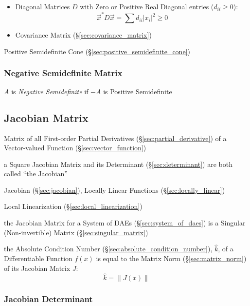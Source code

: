 \begin{itemize}
  \item Diagonal Matrices $D$ with Zero or Positive Real Diagonal entries
    ($d_{ii} \geq 0$):
    \[
      \vec{x}^*D\vec{x} = \sum d_{ii}|x_i|^2 \geq 0
    \]
  \item Covariance Matrix (\S\ref{sec:covariance_matrix})
\end{itemize}

\fist Positive Semidefinite Cone (\S\ref{sec:positive_semidefinite_cone})



\subsubsection{Negative Semidefinite Matrix}\label{sec:semidefinite_matrix}

$A$ is \emph{Negative Semidefinite} if $-A$ is Positive Semidefinite



\subsection{Jacobian Matrix}\label{sec:jacobian_matrix}


Matrix of all First-order Partial Derivatives (\S\ref{sec:partial_derivative})
of a Vector-valued Function (\S\ref{sec:vector_function})

a Square Jacobian Matrix and its Determinant (\S\ref{sec:determinant}) are both
called ``the Jacobian''

Jacobian (\S\ref{sec:jacobian}),
Locally Linear Functions (\S\ref{sec:locally_linear})

\fist Local Linearization (\S\ref{sec:local_linearization})

\fist the Jacobian Matrix for a System of DAEs (\S\ref{sec:system_of_daes}) is
a Singular (Non-invertible) Matrix (\S\ref{sec:singular_matrix})

the Absolute Condition Number (\S\ref{sec:absolute_condition_number}),
$\hat{k}$, of a Differentiable Function $f(x)$ is equal to the Matrix Norm
(\S\ref{sec:matrix_norm}) of its Jacobian Matrix $J$:
\[
  \hat{k} = \|J(x)\|
\]



\subsubsection{Jacobian Determinant}\label{sec:jacobian_determinant}



